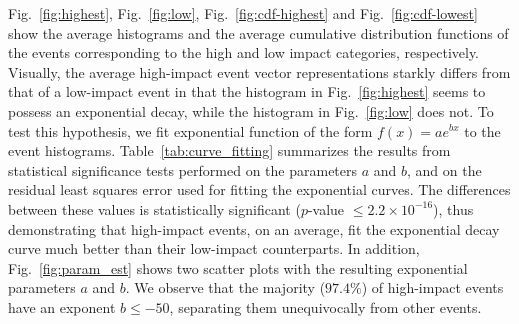 \documentclass[10pt,letterpaper]{article}
\begin{document}
{Fig.~\ref{fig:highest}, Fig.~\ref{fig:low}, Fig.~\ref{fig:cdf-highest} and
Fig.~\ref{fig:cdf-lowest} show the average histograms and the average
cumulative distribution functions of the events corresponding to the
high and low impact categories, respectively.  Visually, the average
high-impact event vector representations starkly differs from that of
a low-impact event in that the histogram in Fig.~\ref{fig:highest}
seems to possess an exponential decay, while the histogram in
Fig.~\ref{fig:low} does not.  To test this hypothesis, we fit
exponential function of the form $f(x)=ae^{bx}$ to the event
histograms. Table~\ref{tab:curve_fitting} summarizes the results from
statistical significance tests performed on the parameters $a$ and
$b$, and on the residual least squares error used for fitting the
exponential curves.  The differences between these values is
statistically significant ($p$-value $\leq2.2\times 10^{-16}$), thus demonstrating
that high-impact events, on an average, fit the exponential decay
curve much better than their low-impact counterparts.  In addition,
Fig.~\ref{fig:param_est} shows two scatter plots with the resulting
exponential parameters $a$ and $b$.  We observe that the majority
($97.4\%$) of high-impact events have an exponent $b \leq -50$,
separating them unequivocally from other events.
}
\end{document}
